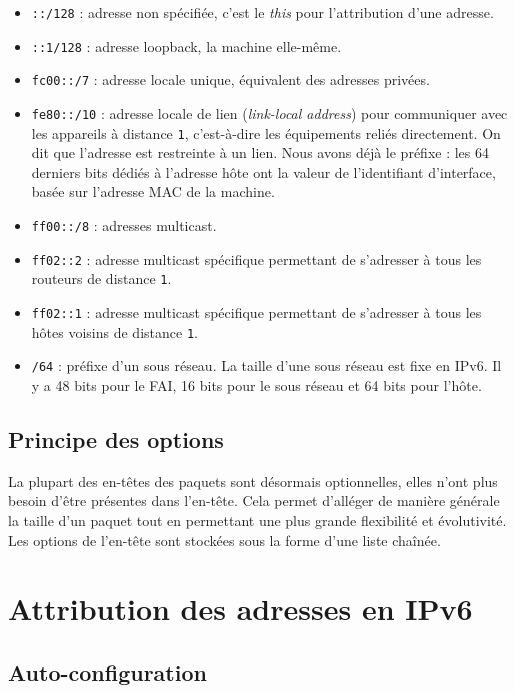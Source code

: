 \begin{itemize}
  \item	\texttt{::/128} : adresse non spécifiée, c’est le \emph{this} pour l’attribution d’une adresse.
  \item	\texttt{::1/128} : adresse loopback, la machine elle-même.
  \item	\texttt{fc00::/7} : adresse locale unique, équivalent des adresses privées.
  \item \texttt{fe80::/10} : adresse locale de lien (\textit{link-local address}) pour communiquer avec les appareils à distance \texttt{1}, c’est-à-dire les équipements reliés directement.
On dit que l’adresse est restreinte à un lien.
Nous avons déjà le préfixe : les 64 derniers bits dédiés à l’adresse hôte ont la valeur de l’identifiant d’interface, basée sur l’adresse MAC de la machine.
  \item \texttt{ff00::/8} : adresses multicast.
  \item \texttt{ff02::2} : adresse multicast spécifique permettant de s’adresser à tous les routeurs de distance \texttt{1}.
  \item \texttt{ff02::1} : adresse multicast spécifique permettant de s’adresser à tous les hôtes voisins de distance \texttt{1}.
  \item \texttt{/64} : préfixe d’un sous réseau. La taille d’une sous réseau est fixe en IPv6.
Il y a 48 bits pour le FAI, 16 bits pour le sous réseau et 64 bits pour l’hôte.
\end{itemize}

\subsection{Principe des options}

La plupart des en-têtes des paquets sont désormais optionnelles, elles n'ont plus besoin d'être présentes dans l'en-tête.
Cela permet d’alléger de manière générale la taille d’un paquet tout en permettant une plus grande flexibilité et évolutivité.
Les options de l’en-tête sont stockées sous la forme d’une liste chaînée.

\newpage
\section{Attribution des adresses en IPv6}

\subsection{Auto-configuration}

